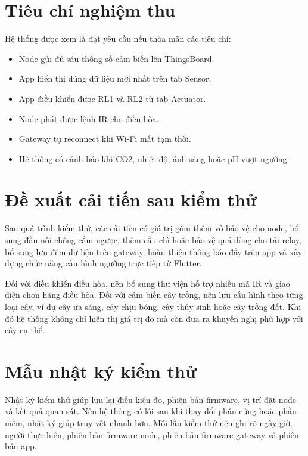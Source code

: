 \section{Tiêu chí nghiệm thu}
Hệ thống được xem là đạt yêu cầu nếu thỏa mãn các tiêu chí:
\begin{itemize}
    \item Node gửi đủ sáu thông số cảm biến lên ThingsBoard.
    \item App hiển thị đúng dữ liệu mới nhất trên tab Sensor.
    \item App điều khiển được RL1 và RL2 từ tab Actuator.
    \item Node phát được lệnh IR cho điều hòa.
    \item Gateway tự reconnect khi Wi-Fi mất tạm thời.
    \item Hệ thống có cảnh báo khi CO2, nhiệt độ, ánh sáng hoặc pH vượt ngưỡng.
\end{itemize}

\section{Đề xuất cải tiến sau kiểm thử}
Sau quá trình kiểm thử, các cải tiến có giá trị gồm thêm vỏ bảo vệ cho node, bổ sung đầu nối chống cắm ngược, thêm cầu chì hoặc bảo vệ quá dòng cho tải relay, bổ sung lưu đệm dữ liệu trên gateway, hoàn thiện thông báo đẩy trên app và xây dựng chức năng cấu hình ngưỡng trực tiếp từ Flutter.

Đối với điều khiển điều hòa, nên bổ sung thư viện hỗ trợ nhiều mã IR và giao diện chọn hãng điều hòa. Đối với cảm biến cây trồng, nên lưu cấu hình theo từng loại cây, ví dụ cây ưa sáng, cây chịu bóng, cây thủy sinh hoặc cây trồng đất. Khi đó hệ thống không chỉ hiển thị giá trị đo mà còn đưa ra khuyến nghị phù hợp với cây cụ thể.

\section{Mẫu nhật ký kiểm thử}
Nhật ký kiểm thử giúp lưu lại điều kiện đo, phiên bản firmware, vị trí đặt node và kết quả quan sát. Nếu hệ thống có lỗi sau khi thay đổi phần cứng hoặc phần mềm, nhật ký giúp truy vết nhanh hơn. Mỗi lần kiểm thử nên ghi rõ ngày giờ, người thực hiện, phiên bản firmware node, phiên bản firmware gateway và phiên bản app.

